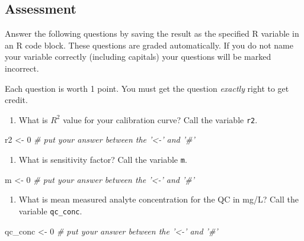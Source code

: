 \documentclass[]{tufte-book}
\newenvironment{Shaded}{}{}
\newcommand{\CommentTok}[1]{\textcolor[rgb]{0.38,0.63,0.69}{\textit{#1}}}
\newcommand{\DecValTok}[1]{\textcolor[rgb]{0.25,0.63,0.44}{#1}}
\newcommand{\NormalTok}[1]{#1}
\newcommand{\StringTok}[1]{\textcolor[rgb]{0.25,0.44,0.63}{#1}}
\providecommand{\tightlist}{%
  \setlength{\itemsep}{0pt}\setlength{\parskip}{0pt}}
\begin{document}
\hypertarget{am-faas-assessment}{%
\subsection{Assessment}\label{am-faas-assessment}}

Answer the following questions by saving the result as the specified R variable in an R code block. These questions are graded automatically. If you do not name your variable correctly (including capitals) your questions will be marked incorrect.

Each question is worth 1 point. You must get the question \emph{exactly} right to get credit.

\begin{enumerate}
\def\labelenumi{\arabic{enumi}.}
\tightlist
\item
  What is \(R^2\) value for your calibration curve? Call the variable \texttt{r2}.
\end{enumerate}

\begin{Shaded}
\begin{Highlighting}[]
\NormalTok{r2 <-}\StringTok{ }\DecValTok{0}     \CommentTok{# put your answer between the '<-' and '#'}
\end{Highlighting}
\end{Shaded}

\begin{enumerate}
\def\labelenumi{\arabic{enumi}.}
\setcounter{enumi}{1}
\tightlist
\item
  What is sensitivity factor? Call the variable \texttt{m}.
\end{enumerate}

\begin{Shaded}
\begin{Highlighting}[]
\NormalTok{m <-}\StringTok{ }\DecValTok{0}     \CommentTok{# put your answer between the '<-' and '#'}
\end{Highlighting}
\end{Shaded}

\begin{enumerate}
\def\labelenumi{\arabic{enumi}.}
\setcounter{enumi}{2}
\tightlist
\item
  What is mean measured analyte concentration for the QC in mg/L? Call the variable \texttt{qc\_conc}.
\end{enumerate}

\begin{Shaded}
\begin{Highlighting}[]
\NormalTok{qc_conc <-}\StringTok{ }\DecValTok{0}     \CommentTok{# put your answer between the '<-' and '#'}
\end{Highlighting}
\end{Shaded}
\end{document}
